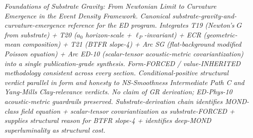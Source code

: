 \documentclass[
  11pt,a4paper]{article}
\begin{document}
\emph{Foundations of Substrate Gravity: From Newtonian Limit to
Curvature Emergence in the Event Density Framework. Canonical
substrate-gravity-and-curvature-emergence reference for the ED program.
Integrates T19 (Newton's \(G\) from substrate) + T20 (\(a_0\)
horizon-scale + \(\ell_P\)-invariant) + ECR (geometric-mean composition)
+ T21 (BTFR slope-4) + Arc SG (flat-background modified Poisson
equation) + Arc ED-10 (scalar-tensor acoustic-metric covariantization)
into a single publication-grade synthesis. Form-FORCED / value-INHERITED
methodology consistent across every section. Conditional-positive
structural verdict parallel in form and honesty to NS-Smoothness
Intermediate Path C and Yang-Mills Clay-relevance verdicts. No claim of
GR derivation; ED-Phys-10 acoustic-metric guardrails preserved.
Substrate-derivation chain identifies MOND-class field equation +
scalar-tensor covariantization as substrate-FORCED + supplies structural
reason for BTFR slope-4 + identifies deep-MOND superluminality as
structural cost.}
\end{document}
